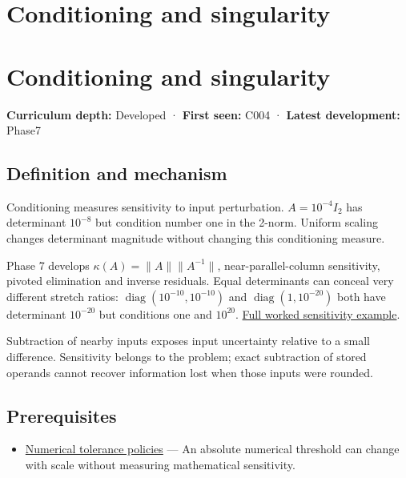 \hypertarget{appendix-8f6a01f284a7}{}
\section*{Conditioning and singularity}
\section{Conditioning and singularity}\label{conditioning-and-singularity}

\textbf{Curriculum depth:} Developed · \textbf{First seen:} C004 · \textbf{Latest development:} Phase7

\subsection{Definition and mechanism}\label{definition-and-mechanism}

Conditioning measures sensitivity to input perturbation. \(A=10^{-4}I_2\) has determinant \(10^{-8}\) but condition number one in the 2-norm. Uniform scaling changes determinant magnitude without changing this conditioning measure.

Phase 7 develops \(\kappa(A)=\|A\|\|A^{-1}\|\), near-parallel-column sensitivity, pivoted elimination and inverse residuals. Equal determinants can conceal very different stretch ratios: \(\operatorname{diag}(10^{-10},10^{-10})\) and \(\operatorname{diag}(1,10^{-20})\) both have determinant \(10^{-20}\) but conditions one and \(10^{20}\). \href{Continuous\%20Notes/Computing\%20Foundations\%20-\%20From\%20Bits\%20to\%20C++\%20and\%20Systems\%20APIs\#An\%20inverse\%20can\%20exist\%20and\%20still\%20amplify\%20uncertainty}{Full worked sensitivity example}.

Subtraction of nearby inputs exposes input uncertainty relative to a small difference. Sensitivity belongs to the problem; exact subtraction of stored operands cannot recover information lost when those inputs were rounded.

\subsection{Prerequisites}\label{prerequisites}

\begin{itemize}
\tightlist
\item
  \hyperref[appendix-0ec599f8ba27]{Numerical tolerance policies} --- An absolute numerical threshold can change with scale without measuring mathematical sensitivity.
\end{itemize}

